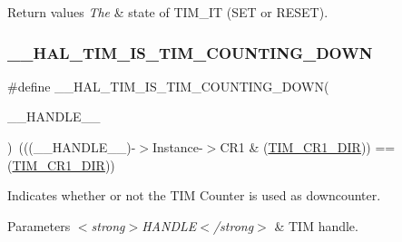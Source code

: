 \begin{DoxyRetVals}{Return values}
{\em The} & state of T\+I\+M\+\_\+\+IT (S\+ET or R\+E\+S\+ET). \\
\hline
\end{DoxyRetVals}
\mbox{\label{group___t_i_m___exported___macros_gac73f5e7669d92971830481e7298e98ba}} 
\subsubsection{\texorpdfstring{\+\_\+\+\_\+\+H\+A\+L\+\_\+\+T\+I\+M\+\_\+\+I\+S\+\_\+\+T\+I\+M\+\_\+\+C\+O\+U\+N\+T\+I\+N\+G\+\_\+\+D\+O\+WN}{\_\_HAL\_TIM\_IS\_TIM\_COUNTING\_DOWN}}
{\footnotesize\ttfamily \#define \+\_\+\+\_\+\+H\+A\+L\+\_\+\+T\+I\+M\+\_\+\+I\+S\+\_\+\+T\+I\+M\+\_\+\+C\+O\+U\+N\+T\+I\+N\+G\+\_\+\+D\+O\+WN(\begin{DoxyParamCaption}\item[{}]{\+\_\+\+\_\+\+H\+A\+N\+D\+L\+E\+\_\+\+\_\+ }\end{DoxyParamCaption})~(((\+\_\+\+\_\+\+H\+A\+N\+D\+L\+E\+\_\+\+\_\+)-\/$>$Instance-\/$>$C\+R1 \& (\hyperlink{group___peripheral___registers___bits___definition_gacea10770904af189f3aaeb97b45722aa}{T\+I\+M\+\_\+\+C\+R1\+\_\+\+D\+IR})) == (\hyperlink{group___peripheral___registers___bits___definition_gacea10770904af189f3aaeb97b45722aa}{T\+I\+M\+\_\+\+C\+R1\+\_\+\+D\+IR}))}



Indicates whether or not the T\+IM Counter is used as downcounter. 


\begin{DoxyParams}{Parameters}
{\em $<$strong$>$\+H\+A\+N\+D\+L\+E$<$/strong$>$} & T\+IM handle. \\
\hline
\end{DoxyParams}

